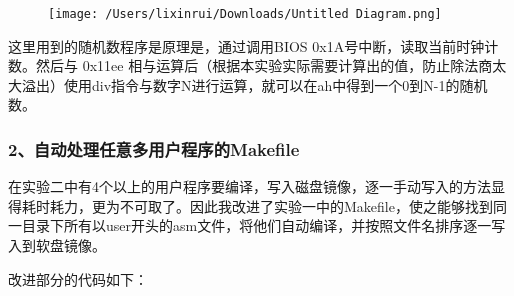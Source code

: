 \documentclass[ctexart]{article}
\begin{document}
\begin{figure}
\centering
\texttt{[image: /Users/lixinrui/Downloads/Untitled Diagram.png]}
\caption{}
\end{figure}

这里用到的随机数程序是原理是，通过调用BIOS
0x1A号中断，读取当前时钟计数。然后与 0x11ee
相与运算后（根据本实验实际需要计算出的值，防止除法商太大溢出）使用div指令与数字N进行运算，就可以在ah中得到一个0到N-1的随机数。

\hypertarget{header-n511}{%
\subsubsection{2、自动处理任意多用户程序的Makefile}\label{header-n511}}

在实验二中有4个以上的用户程序要编译，写入磁盘镜像，逐一手动写入的方法显得耗时耗力，更为不可取了。因此我改进了实验一中的Makefile，使之能够找到同一目录下所有以user开头的asm文件，将他们自动编译，并按照文件名排序逐一写入到软盘镜像。

改进部分的代码如下：
\end{document}
